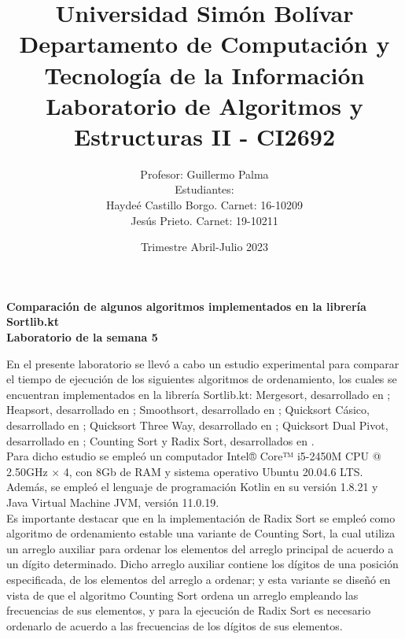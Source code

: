 \documentclass{article}
\begin{document}
	\title{\normalsize{Universidad Sim\'on Bol\'ivar\\
			Departamento de Computaci\'on y Tecnolog\'ia de la Informaci\'on\\
			Laboratorio de Algoritmos y Estructuras II - CI2692}}
	\author{\normalsize{Profesor: Guillermo Palma}\\
		\normalsize{Estudiantes:}\\
		\normalsize{Hayde\'e Castillo Borgo. Carnet: 16-10209}\\
		\normalsize{Jes\'us Prieto. Carnet: 19-10211}}
	\date{\normalsize{Trimestre Abril-Julio 2023}}
	\maketitle
	\begin{center}
		\large{\textbf{Comparaci\'on de algunos algoritmos implementados en la librer\'ia Sortlib.kt}}\\
		\large{\textbf{Laboratorio de la semana 5}}
	\end{center}\:
	
	En el presente laboratorio se llev\'o a cabo un estudio experimental para comparar el tiempo de ejecuci\'on de los siguientes algoritmos de ordenamiento, los cuales se encuentran implementados en la librer\'ia Sortlib.kt: Mergesort, desarrollado en \cite{1}; Heapsort, desarrollado en \cite{2}; Smoothsort, desarrollado en \cite{3}; Quicksort C\'asico, desarrollado en \cite{2}; Quicksort Three Way, desarrollado en \cite{4}; Quicksort Dual Pivot, desarrollado en \cite{5}; Counting Sort y Radix Sort, desarrollados en \cite{2}.\\
	
	Para dicho estudio se emple\'o un computador Intel® Core™ i5-2450M CPU @ 2.50GHz × 4, con 8Gb de RAM y sistema operativo Ubuntu 20.04.6 LTS. Adem\'as, se emple\'o el lenguaje de programaci\'on Kotlin en su versi\'on 1.8.21 y Java Virtual Machine JVM, versi\'on 11.0.19.\\
	
	Es importante destacar que en la implementaci\'on de Radix Sort se emple\'o como algoritmo de ordenamiento estable una variante de Counting Sort, la cual utiliza un arreglo auxiliar para ordenar los elementos del arreglo principal de acuerdo a un d\'igito determinado. Dicho arreglo auxiliar contiene los d\'igitos de una posici\'on especificada, de los elementos del arreglo a ordenar; y esta variante se diseñ\'o en vista de que el algoritmo Counting Sort ordena un arreglo empleando las frecuencias de sus elementos, y para la ejecuci\'on de Radix Sort es necesario ordenarlo de acuerdo a las frecuencias de los d\'igitos de sus elementos.\\
	
\end{document}
